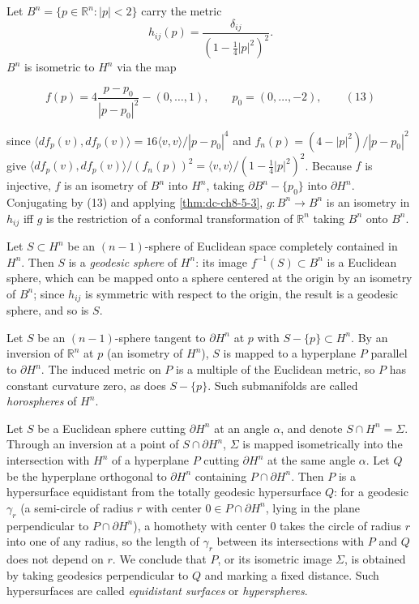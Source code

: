 \begin{remark}
  \label{rem:dc-ch8-5-4}
  \notready
\sketch
  Let $B^n=\{p\in\mathbb R^n:|p|<2\}$ carry the metric
  $$
  h_{ij}(p)=\frac{\delta_{ij}}{(1-\tfrac14|p|^2)^2}.
  $$
  $B^n$ is isometric to $H^n$ via the map


  $$
  f(p)=4\frac{p-p_0}{|p-p_0|^2}-(0,\dots,1),\qquad p_0=(0,\dots,-2),\qquad(13)
  $$


  since $\langle df_p(v),df_p(v)\rangle=16\langle v,v\rangle/|p-p_0|^4$ and
  $f_n(p)=(4-|p|^2)/|p-p_0|^2$ give
  $\langle df_p(v),df_p(v)\rangle/(f_n(p))^2=\langle v,v\rangle/(1-\tfrac14|p|^2)^2$.
  Because $f$ is injective, $f$ is an isometry of $B^n$ into $H^n$, taking
  $\partial B^n-\{p_0\}$ into $\partial H^n$. Conjugating by (13) and applying
  \cref{thm:dc-ch8-5-3}, $g:B^n\to B^n$ is an isometry in $h_{ij}$ iff $g$ is the
  restriction of a conformal transformation of $\mathbb{R}^n$ taking $B^n$ onto
  $B^n$.

  Let $S\subset H^n$ be an $(n-1)$-sphere of Euclidean space completely contained in
  $H^n$. Then $S$ is a \emph{geodesic sphere} of $H^n$: its image $f^{-1}(S)\subset B^n$ is
  a Euclidean sphere, which can be mapped onto a sphere centered at the origin by an
  isometry of $B^n$; since $h_{ij}$ is symmetric with respect to the origin, the
  result is a geodesic sphere, and so is $S$.

  Let $S$ be an $(n-1)$-sphere tangent to $\partial H^n$ at $p$ with
  $S-\{p\}\subset H^n$. By an inversion of $\mathbb{R}^n$ at $p$ (an isometry of
  $H^n$), $S$ is mapped to a hyperplane $P$ parallel to $\partial H^n$. The induced
  metric on $P$ is a multiple of the Euclidean metric, so $P$ has constant curvature
  zero, as does $S-\{p\}$. Such submanifolds are called \emph{horospheres} of $H^n$.

  Let $S$ be a Euclidean sphere cutting $\partial H^n$ at an angle $\alpha$, and
  denote $S\cap H^n=\Sigma$. Through an inversion at a point of $S\cap\partial H^n$,
  $\Sigma$ is mapped isometrically into the intersection with $H^n$ of a hyperplane $P$
  cutting $\partial H^n$ at the same angle $\alpha$. Let $Q$ be the hyperplane
  orthogonal to $\partial H^n$ containing $P\cap\partial H^n$. Then $P$ is a
  hypersurface equidistant from the totally geodesic hypersurface $Q$: for a geodesic
  $\gamma_r$ (a semi-circle of radius $r$ with center $0\in P\cap\partial H^n$,
  lying in the plane perpendicular to $P\cap\partial H^n$), a
  homothety with center $0$ takes the circle of radius $r$ into one of any radius, so
  the length of $\gamma_r$ between its intersections with $P$ and $Q$ does not depend
  on $r$. We conclude that $P$, or its isometric image $\Sigma$, is obtained by taking
  geodesics perpendicular to $Q$ and marking a fixed distance. Such hypersurfaces are
  called \emph{equidistant surfaces} or \emph{hyperspheres}.
\end{remark}
